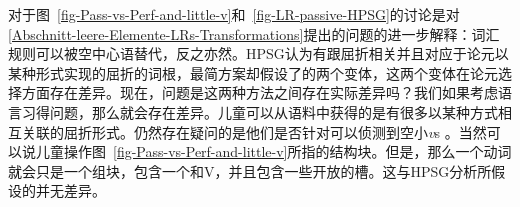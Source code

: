 对于图~\ref{fig-Pass-vs-Perf-and-little-v}和~\ref{fig-LR-passive-HPSG}的讨论是对\ref{Abschnitt-leere-Elemente-LRs-Transformations}提出的问题的进一步解释：词汇规则可以被空中心语替代，反之亦然。HPSG认为有跟屈折相关并且对应于论元以某种形式实现的屈折的词根，最简方案却假设了\littlevc 的两个变体，这两个变体在论元选择方面存在差异。现在，问题是这两种方法之间存在实际差异吗？我们如果考虑语言习得问题，那么就会存在差异。儿童可以从语料中获得的是有很多以某种方式相互关联的屈折形式。仍然存在疑问的是他们是否针对可以侦测到空小\textit{v}s 。当然可以说儿童操作图~\ref{fig-Pass-vs-Perf-and-little-v}所指的结构块。但是，那么一个动词就会只是一个组块，包含一个\littlevc 和V，并且包含一些开放的槽。这与HPSG分析所假设的并无差异。

